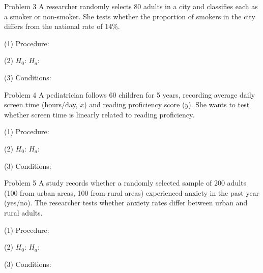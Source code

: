 \documentclass[10pt]{article}
\begin{document}
\begin{notesbox}{Problem 3}
A researcher randomly selects 80 adults in a city and classifies each as a smoker or
non-smoker. She tests whether the proportion of smokers in the city differs from the
national rate of 14\%.

\vspace{0.08in}
(1) Procedure: 

\vspace{0.08in}
(2) $H_0$: 
$H_a$: 

\vspace{0.08in}
(3) Conditions: 
\end{notesbox}

\begin{notesbox}{Problem 4}
A pediatrician follows 60 children for 5 years, recording average daily screen time
(hours/day, $x$) and reading proficiency score ($y$). She wants to test whether screen
time is linearly related to reading proficiency.

\vspace{0.08in}
(1) Procedure: 

\vspace{0.08in}
(2) $H_0$: 
$H_a$: 

\vspace{0.08in}
(3) Conditions: 
\end{notesbox}

\begin{notesbox}{Problem 5}
A study records whether a randomly selected sample of 200 adults (100 from urban areas,
100 from rural areas) experienced anxiety in the past year (yes/no). The researcher
tests whether anxiety rates differ between urban and rural adults.

\vspace{0.08in}
(1) Procedure: 

\vspace{0.08in}
(2) $H_0$: 
$H_a$: 

\vspace{0.08in}
(3) Conditions: 
\end{notesbox}
\end{document}
